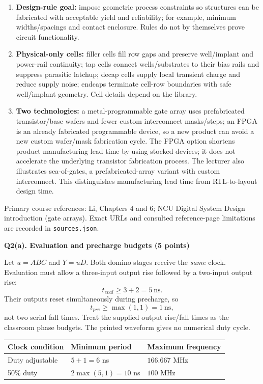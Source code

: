 \documentclass[10pt]{article}
\newcommand{\qheading}[1]{\par\medskip\textbf{#1}\par}
\begin{document}
\begin{enumerate}[label=(\alph*),leftmargin=7mm,itemsep=5pt]
\item \textbf{Design-rule goal:} impose geometric process constraints so structures can be fabricated with acceptable yield and reliability; for example, minimum widths/spacings and contact enclosure. Rules do not by themselves prove circuit functionality.
\item \textbf{Physical-only cells:} filler cells fill row gaps and preserve well/implant and power-rail continuity; tap cells connect wells/substrates to their bias rails and suppress parasitic latchup; decap cells supply local transient charge and reduce supply noise; endcaps terminate cell-row boundaries with safe well/implant geometry. Cell details depend on the library.
\item \textbf{Two technologies:} a metal-programmable gate array uses prefabricated transistor/base wafers and fewer custom interconnect masks/steps; an FPGA is an already fabricated programmable device, so a new product can avoid a new custom wafer/mask fabrication cycle. The FPGA option shortens product manufacturing lead time by using stocked devices; it does not accelerate the underlying transistor fabrication process. The lecturer also illustrates sea-of-gates, a prefabricated-array variant with custom interconnect. This distinguishes manufacturing lead time from RTL-to-layout design time.
\end{enumerate}
\small Primary course references: Li, Chapters 4 and 6; NCU Digital System Design introduction (gate arrays). Exact URLs and consulted reference-page limitations are recorded in \texttt{sources.json}.\normalsize
\newpage
\qheading{Q2(a). Evaluation and precharge budgets (5 points)}
Let $u=ABC$ and $Y=uD$. Both domino stages receive the \emph{same} clock. Evaluation must allow a three-input output rise followed by a two-input output rise:
\[
t_{eval}\ge3+2=5\ \mathrm{ns}.
\]
Their outputs reset simultaneously during precharge, so
\[
t_{pre}\ge\max(1,1)=1\ \mathrm{ns},
\]
not two serial fall times. Treat the supplied output rise/fall times as the classroom phase budgets. The printed waveform gives no numerical duty cycle.
\begin{center}\begin{tabular}{lll}\toprule
Clock condition&Minimum period&Maximum frequency\\\midrule
Duty adjustable&$5+1=6$ ns&$166.667$ MHz\\
50\% duty&$2\max(5,1)=10$ ns&$100$ MHz\\\bottomrule
\end{tabular}\end{center}
\end{document}
